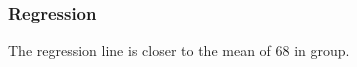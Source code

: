 \documentclass[handout]{beamer}
\begin{document}


   \begin{frame}
   \frametitle{Regression}
   \begin{center}
   \end{center}
   The regression line is closer to the mean of 68 in group.
   \end{frame}

\end{document}

